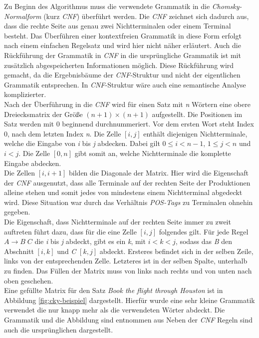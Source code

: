 Zu Beginn des Algorithmus muss die verwendete Grammatik in die \textit{Chomsky-Normalform} (kurz \textit{CNF}) überführt werden. Die \textit{CNF} zeichnet sich dadurch aus, dass die rechte Seite aus genau zwei Nichtterminalen oder einem Terminal besteht. Das Überführen einer kontextfreien Grammatik in diese Form erfolgt nach einem einfachen Regelsatz und wird hier nicht näher erläutert. Auch die Rückführung der Grammatik in \textit{CNF} in die ursprüngliche Grammatik ist mit zusätzlich abgespeicherten Informationen möglich. Diese Rückführung wird gemacht, da die Ergebnisbäume der \textit{CNF}-Struktur und nicht der eigentlichen Grammatik entsprechen. In \textit{CNF}-Struktur wäre auch eine semantische Analyse komplizierter. \\
Nach der Überführung in die \textit{CNF} wird für einen Satz mit \textit{n} Wörtern eine obere Dreiecksmatrix der Größe \((n+1) \times (n+1) \) aufgestellt. Die Positionen im Satz werden mit 0 beginnend durchnummeriert. Vor dem ersten Wort steht Index 0, nach dem letzten Index \textit{n}. Die Zelle \([i, j]\) enthält diejenigen Nichtterminale, welche die Eingabe von \textit{i} bis \textit{j} abdecken. Dabei gilt \( 0 \leq i < n-1 \), \( 1 \leq j < n \) und \(i < j\). Die Zelle \([0, n]\) gibt somit an, welche Nichtterminale die komplette Eingabe abdecken.\\
Die Zellen \([i, i+1]\) bilden die Diagonale der Matrix. Hier wird die Eigenschaft der \textit{CNF} ausgenutzt, dass alle Terminale auf der rechten Seite der Produktionen alleine stehen und somit jedes von mindestens einem Nichtterminal abgedeckt wird. Diese Situation war durch das Verhältnis \textit{POS-Tags} zu Terminalen ohnehin gegeben.\\
Die Eigenschaft, dass Nichtterminale auf der rechten Seite immer zu zweit auftreten führt dazu, dass für die eine Zelle \([i, j]\) folgendes gilt. Für jede Regel \( A \to B\;C \) die \textit{i} bis \textit{j} abdeckt, gibt es ein \textit{k}, mit \( i < k < j\), sodass das \textit{B} den Abschnitt \([i, k]\) und \textit{C} \([k, j]\) abdeckt. Ersteres befindet sich in der selben Zeile, links von der entsprechenden Zelle. Letzteres ist in der selben Spalte, unterhalb zu finden. Das Füllen der Matrix muss von links nach rechts und von unten nach oben geschehen.\\
Eine gefüllte Matrix für den Satz \textit{Book the flight through Houston} ist in Abbildung \ref{fig:cky-beispiel} dargestellt. Hierfür wurde eine sehr kleine Grammatik verwendet die nur knapp mehr als die verwendeten Wörter abdeckt. Die Grammatik und die Abbildung sind entnommen aus \cite[Kapitel 11]{nlpGrundlagen} Neben der \textit{CNF} Regeln sind auch die ursprünglichen dargestellt.

